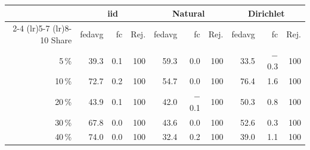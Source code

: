 \begin{tabular}{rrrrrrrrrr}
\toprule
 & \multicolumn{3}{c}{\gls{iid}} & \multicolumn{3}{c}{Natural} & \multicolumn{3}{c}{Dirichlet} \\
\cmidrule(lr){2-4} \cmidrule(lr){5-7} \cmidrule(lr){8-10}
Share & \gls{fedavg} & \gls{fc} & Rej. & \gls{fedavg} & \gls{fc} & Rej. & \gls{fedavg} & \gls{fc} & Rej. \\
\midrule
5\,\% & 39.3 & 0.1 & 100 & 59.3 & 0.0 & 100 & 33.5 & $-$0.3 & 100 \\
10\,\% & 72.7 & 0.2 & 100 & 54.7 & 0.0 & 100 & 76.4 & 1.6 & 100 \\
20\,\% & 43.9 & 0.1 & 100 & 42.0 & $-$0.1 & 100 & 50.3 & 0.8 & 100 \\
30\,\% & 67.8 & 0.0 & 100 & 43.6 & 0.0 & 100 & 52.6 & 0.3 & 100 \\
40\,\% & 74.0 & 0.0 & 100 & 32.4 & 0.2 & 100 & 39.0 & 1.1 & 100 \\
\bottomrule
\end{tabular}

